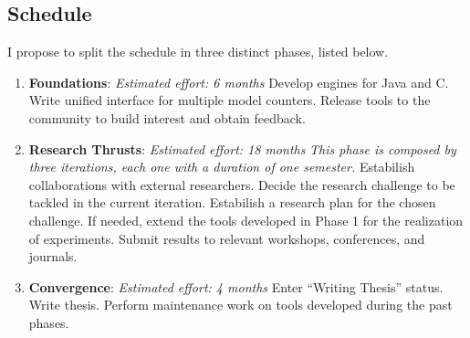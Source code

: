 \documentclass[10pt]{article}
\newcounter{list}
\begin{document}
\subsection{Schedule}

I propose to split the schedule in three distinct phases, listed below.

\begin{enumerate}[label=(\texttt{Phase \arabic*})]

\item \textbf{Foundations}: \textit{Estimated effort: 6 months}
  Develop \PSE engines for Java and C. Write unified interface for
  multiple model counters. Release tools to the community to build
  interest and obtain feedback.

\item \textbf{Research Thrusts}: \textit{Estimated effort: 18 months}
  \textit{This phase is composed by three iterations, each one with a
    duration of one semester.} Estabilish collaborations with external
  researchers.  Decide the research challenge to be tackled in the
  current iteration. Estabilish a research plan for the chosen
  challenge.  If needed, extend the \PSE{} tools developed in Phase 1
  for the realization of experiments. Submit results to relevant
  workshops, conferences, and journals.
  
\item \textbf{Convergence}: \textit{Estimated effort: 4 months} Enter
  ``Writing Thesis'' status. Write thesis. Perform maintenance work on
  tools developed during the past phases.

\end{enumerate}


 
\end{document}
